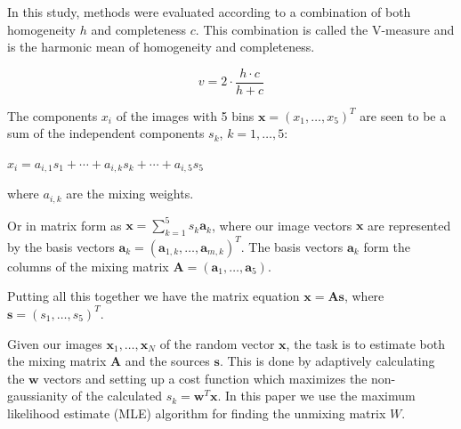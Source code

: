\documentclass[a4paper,11pt]{article}
\begin{document}
    



In this study, methods were evaluated according to a combination of both homogeneity $h$ and completeness $c$. This combination is called the V-measure and is the harmonic mean of homogeneity and completeness.

\begin{equation}
v = 2 \cdot \frac{h \cdot c}{h + c}
\end{equation}

The components $x_i$ of the images with 5 bins $\boldsymbol{x}=(x_1,\ldots,x_5)^T$ are seen to be a sum of the independent components $s_k$, $k=1,\ldots,5$:

$x_i = a_{i,1} s_1 + \cdots + a_{i,k} s_k + \cdots + a_{i,5} s_5$

where $a_{i,k}$ are the mixing weights.

Or in matrix form as $\boldsymbol{x}=\sum_{k=1}^{5} s_k \boldsymbol{a}_k$, where our image vectors $\boldsymbol{x}$ are represented by the basis vectors $\boldsymbol{a}_k=(\boldsymbol{a}_{1,k},\ldots,\boldsymbol{a}_{m,k})^T$. The basis vectors $\boldsymbol{a}_k$ form the columns of the mixing matrix $\boldsymbol{A}=(\boldsymbol{a}_1,\ldots,\boldsymbol{a}_5)$.

Putting all this together we have the matrix equation $\boldsymbol{x}=\boldsymbol{A} \boldsymbol{s}$, where $\boldsymbol{s}=(s_1,\ldots,s_5)^T$.

Given our images $\boldsymbol{x}_1,\ldots,\boldsymbol{x}_N$ of the random vector $\boldsymbol{x}$, the task is to estimate both the mixing matrix $\boldsymbol{A}$ and the sources $\boldsymbol{s}$. This is done by adaptively calculating the $\boldsymbol{w}$ vectors and setting up a cost function which maximizes the non-gaussianity of the calculated $s_k = \boldsymbol{w}^T \boldsymbol{x}$. In this paper we use the maximum likelihood estimate (MLE) algorithm for finding the unmixing matrix $W$. 









\vfill
\end{document}
